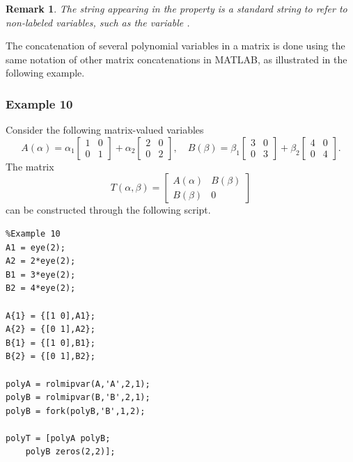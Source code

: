 \documentclass[english,11pt]{article}
\theoremstyle{break} \theorembodyfont{\small\rm}
\newtheorem{rem}{\bf Remark}
\newenvironment{remark}
{\begin{rem}} {\hspace*{\fill}\nolinebreak[1]
\end{rem}
}
\begin{document}
\begin{remark}
 The string \mcode{<>} appearing in the  property is a standard string to refer to non-labeled variables,
 such as the variable .
\end{remark}



The concatenation of several polynomial  variables in a matrix is done using the same notation of 
other matrix concatenations in MATLAB, as illustrated in the following example.

\subsubsection*{Example 10}
Consider the following matrix-valued variables
\[
 A(\alpha) = \alpha_1\begin{bmatrix} 1 & 0 \\ 0 & 1 \end{bmatrix}
 + \alpha_2\begin{bmatrix} 2 & 0 \\ 0 & 2 \end{bmatrix}, \quad
 B(\beta) = \beta_1\begin{bmatrix} 3 & 0 \\ 0 & 3 \end{bmatrix}
 + \beta_2\begin{bmatrix} 4 & 0 \\ 0 & 4 \end{bmatrix}.
\]
The matrix
\[
 T(\alpha,\beta) = \begin{bmatrix} A(\alpha) & B(\beta) \\ B(\beta) & 0 \end{bmatrix}
\]
can be constructed through the following script.

\begin{minipage}{9.5cm}
 \begin{lstlisting}
%Example 10
A1 = eye(2);
A2 = 2*eye(2);
B1 = 3*eye(2);
B2 = 4*eye(2);

A{1} = {[1 0],A1};
A{2} = {[0 1],A2};
B{1} = {[1 0],B1};
B{2} = {[0 1],B2};

polyA = rolmipvar(A,'A',2,1);
polyB = rolmipvar(B,'B',2,1);
polyB = fork(polyB,'B',1,2);

polyT = [polyA polyB; 
    polyB zeros(2,2)];
 \end{lstlisting}
\end{minipage}
\vspace{0.2cm}
\end{document}
